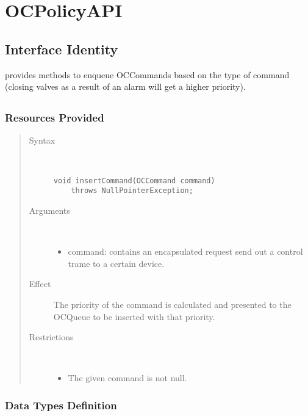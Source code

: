 \section{OCPolicyAPI}
\label{api:oc-policy-api}

\subsection{Interface Identity}

\npar {} provides methods to enqueue
OCCommands based on the type of command (closing valves as a result
of an alarm will get a higher priority).

\subsection{}

\subsubsection{Resources Provided}

\begin{quote}
	\begin{description}
		\item[Syntax] \ 
		\begin{verbatim}
void insertCommand(OCCommand command) 
    throws NullPointerException;
		\end{verbatim}
		\item[Arguments] \
		\begin{itemize}
			\item command: contains an encapsulated request send out a control trame to
			a certain device.
		\end{itemize}
		\item[Effect] The priority of the command is calculated and presented to the
		OCQueue to be inserted with that priority.
		\item[Restrictions] \ 
		\begin{itemize}
			\item The given command is not null.
		\end{itemize}
	\end{description} 
\end{quote}

\subsubsection{Data Types Definition}

